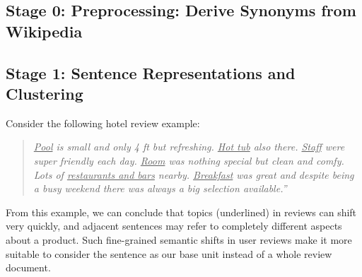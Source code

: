 \subsection{Stage 0: Preprocessing: Derive Synonyms from Wikipedia}

\subsection{Stage 1: Sentence Representations and Clustering}
Consider the following hotel review example:

\begin{quote}
	\textit{\underline{Pool} is small and only 4 ft but refreshing. \underline{Hot tub} also there. \underline{Staff} were super friendly each day. \underline{Room} was nothing special but clean and comfy. Lots of \underline{restaurants and bars} nearby. \underline{Breakfast} was great and despite being a busy weekend there was always a big selection available.''}
\end{quote}

From this example,
we can conclude that topics (underlined) in reviews can shift very quickly, and
adjacent sentences may refer to 
completely different aspects about a product. 
Such fine-grained semantic shifts in user reviews 
make it more suitable to consider the sentence as our base unit instead of a whole review document. 

